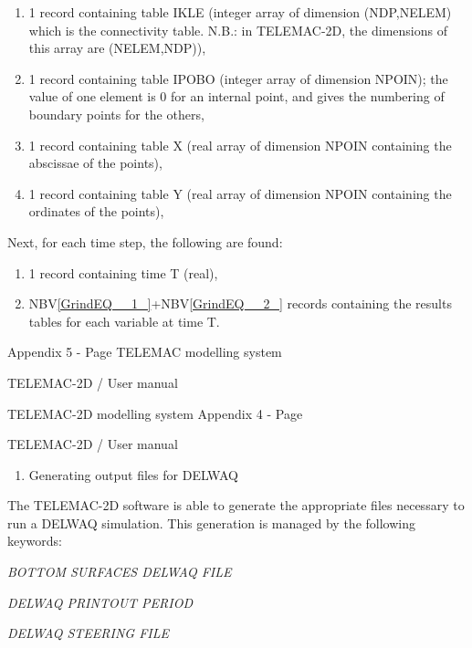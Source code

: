 \documentclass{article} %
\begin{document}
\begin{enumerate}
\item  1 record containing table IKLE (integer array of dimension (NDP,NELEM) which is the connectivity table. N.B.: in TELEMAC-2D, the dimensions of this array are (NELEM,NDP)),

\item  1 record containing table IPOBO (integer array of dimension NPOIN); the value of one element is 0 for an internal point, and gives the numbering of boundary points for the others,

\item  1 record containing table X (real array of dimension NPOIN containing the abscissae of the points),

\item  1 record containing table Y (real array of dimension NPOIN containing the ordinates of the points),
\end{enumerate}

 Next, for each time step, the following are found:

\begin{enumerate}
\item  1 record containing time T (real),

\item  NBV\eqref{GrindEQ__1_}+NBV\eqref{GrindEQ__2_} records containing the results tables for each variable at time T.
\end{enumerate}

 Appendix 5 - Page   TELEMAC modelling system

 TELEMAC-2D / User manual



 TELEMAC-2D modelling system Appendix 4 - Page

 TELEMAC-2D / User manual



\begin{enumerate}
\item   Generating output files for DELWAQ
\end{enumerate}



 The TELEMAC-2D software is able to generate the appropriate files necessary to run a DELWAQ simulation. This generation is managed by the following keywords:



 \textit{BOTTOM SURFACES DELWAQ FILE}

 \textit{DELWAQ PRINTOUT PERIOD}

 \textit{DELWAQ STEERING FILE}
\end{document}

